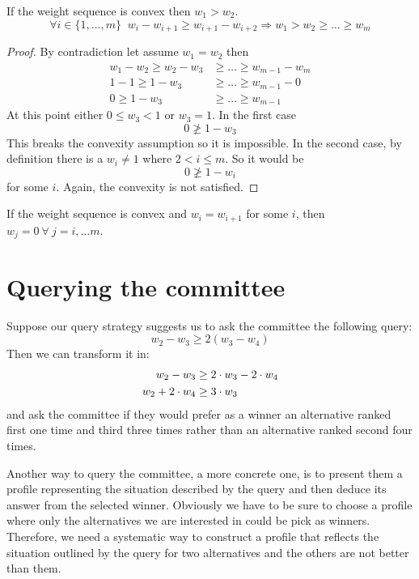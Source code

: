 \begin{claim}
	\label{clm:wsequence}
	If the weight sequence is convex then $w_{1} > w_{2}$.
	\[\forall i \in \{1,\ldots,m\} \;\; w_i - w_{i+1} \geq w_{i+1}-w_{i+2} \Rightarrow w_{1} > w_{2} \geq \ldots \geq w_{m}\] 
\end{claim}
\begin{proof}
	By contradiction let assume $w_{1} = w_{2}$ then 
	\begin{align*}
	w_{1} - w_{2} \geq w_{2} - w_{3} &\geq \dots \geq w_{m-1} - w_{m} \\
	1 - 1 \geq 1 - w_{3} &\geq \dots \geq w_{m-1} - 0 \\
	0 \geq 1 - w_{3} &\geq \dots \geq w_{m-1}
	\end{align*}
	At this point either $0\leq w_{3}<1$ or $w_{3}=1$. In the first case 
	\[0 \ngeq 1 - w_{3}\]
	This breaks the convexity assumption so it is impossible.
	In the second case, by definition there is a $w_{i} \neq 1$ where $2 < i \leq m$. So it would be 
	\[0 \ngeq 1 - w_{i}\]
	for some $i$. Again, the convexity is not satisfied.
\end{proof}

\begin{corollary}
	\label{cor:weq}
	If the weight sequence is convex and $w_{i} = w_{i+1}$ for some $i$, then $w_{j}=0 \ \forall \
	j=i, \dots m$.
\end{corollary}


\section{Querying the committee}
Suppose our query strategy suggests us to ask the committee the following query:
\[ w_{2} - w_{3} \geq 2(w_{3} - w_{4}) \]
Then we can transform it in:
\begin{align}
\label{eqn:juryquery}
w_{2} - w_{3} &\geq 2 \cdot w_{3} - 2 \cdot w_{4} \notag \\
w_{2} + 2 \cdot w_{4} &\geq 3 \cdot w_{3} 
\end{align}
and ask the committee if they would prefer as a winner an alternative ranked first one time and third three times rather than an alternative ranked second four times.

Another way to query the committee, a more concrete one, is to present them a profile representing the situation described by the query and then deduce its answer from the selected winner. Obviously we have to be sure to choose a profile where only the alternatives we are interested in could be pick as winners. Therefore, we need a systematic way to construct a profile that reflects the situation outlined by the query for two alternatives and the others are not better than them.


